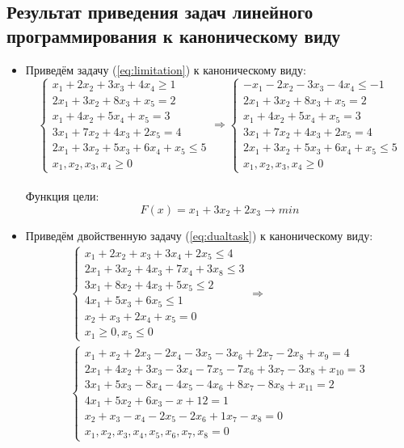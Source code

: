 \documentclass[../body.tex]{subfiles}
\begin{document}
	 \subsection{Результат приведения задач линейного программирования к каноническому виду}
	\begin{itemize}
		\item Приведём задачу (\ref{eq:limitation}) к каноническому виду:\\
	\begin{equation}
		\left\{
		\begin{array}{ll} 
			x_1+2x_2+3x_3+4x_4 \ge 1\\
			2x_1+3x_2+8x_3+x_5=2\\
			x_1+4x_2+5x_4+x_5=3\\
			3x_1+7x_2+4x_3+2x_5 = 4\\
			2x_1+3x_2+5x_3+6x_4+x_5 \le 5\\
			x_1,x_2,x_3,x_4 \ge 0
		\end{array}
		\right.
		\Longrightarrow
		\left\{
		\begin{array}{ll} 
			-x_1-2x_2-3x_3-4x_4 \le -1\\
			2x_1+3x_2+8x_3+x_5=2\\
			x_1+4x_2+5x_4+x_5=3\\
			3x_1+7x_2+4x_3+2x_5 = 4\\
			2x_1+3x_2+5x_3+6x_4+x_5 \le 5\\
			x_1,x_2,x_3,x_4 \ge 0
		\end{array}
		\right.
	\end{equation}\\
	Функция цели:
	$$F(x) =  x_1 + 3x_2 + 2x_3 \longrightarrow min $$
	
\item Приведём двойственную задачу (\ref{eq:dualtask}) к каноническому виду:
\begin{multline} 	
	\left\{
	\begin{array}{ll} 
		x_1+2x_2+x_3+3x_4+2x_5\le 4\\
		2x_1+3x_2+4x_3+7x_4+3x_8 \le 3\\
		3x_1+8x_2+4x_3+5x_5 \le 2\\
		4x_1+5x_3+6x_5 \le 1\\
		x_2+x_3+2x_4+x_5 = 0\\
		x_1\ge 0, x_5 \le 0
	\end{array}
	\right. 
	\Longrightarrow\\
	\left\{
	\begin{array}{ll} 
		x_1+x_2+2x_3-2x_4-3x_5-3x_6+2x_7-2x_8+x_9 = 4\\
		2x_1+4x_2+3x_3-3x_4-7x_5-7x_6+3x_7-3x_8+x_{10} = 3\\
		3x_1+5x_3-8x_4-4x_5-4x_6+8x_7-8x_8+x_{11} = 2 \\
		4x_1+5x_2+6x_3-x+{12}= 1\\
		x_2+x_3-x_4-2x_5-2x_6+1x_7-x_8= 0\\
		x_1,x_2,x_3,x_4,x_5,x_6,x_7,x_8 = 0
	\end{array}
	\right.
\end{multline}


\end{itemize}
\end{document}
